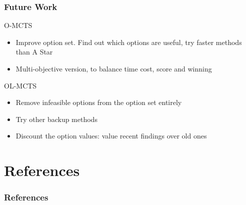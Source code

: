 \documentclass[aspectratio=169]{beamer}
\begin{document}
\begin{frame}
	\frametitle{Future Work}
	\begin{block}{O-MCTS}
		\begin{itemize}
			\item Improve option set. Find out which options are useful, try
				faster methods than A Star
			\item Multi-objective version, to balance time cost, score and
				winning
		\end{itemize}
	\end{block}
	\begin{block}{OL-MCTS}
		\begin{itemize}
			\item Remove infeasible options from the option set entirely
			\item Try other backup methods
			\item Discount the option values: value recent findings over old
				ones
		\end{itemize}
	\end{block}
\end{frame}

\section{References}
\begin{frame}%
	\frametitle{References}
	\tiny{ }
	
\end{frame}
\end{document}
